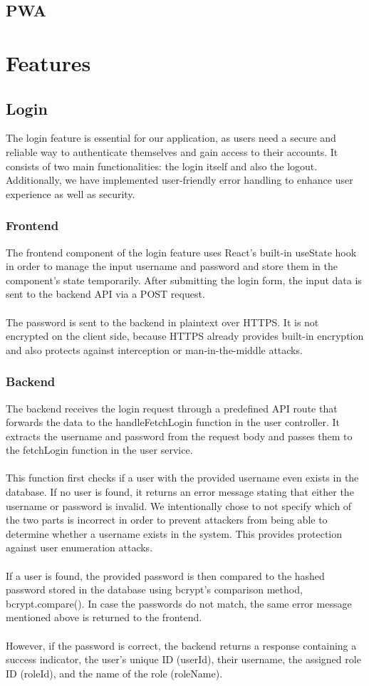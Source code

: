 \documentclass[a4paper,12pt]{report}
\begin{document}
\section{PWA}
\chapter{Features}

\section{Login}
The login feature is essential for our application, as users need a secure and reliable way to authenticate themselves and gain access to their accounts. It consists of two main functionalities: the login itself and also the logout. Additionally, we have implemented user-friendly error handling to enhance user experience as well as security.
\subsection{Frontend}
The frontend component of the login feature uses React's built-in useState hook in order to manage the input username and password and store them in the component's state temporarily. After submitting the login form, the input data is sent to the backend API via a POST request.\\\\
The password is sent to the backend in plaintext over HTTPS. It is not encrypted on the client side, because HTTPS already provides built-in encryption and also protects against interception or man-in-the-middle attacks.
\subsection{Backend}
The backend receives the login request through a predefined API route that forwards the data to the handleFetchLogin function in the user controller. It extracts the username and password from the request body and passes them to the fetchLogin function in the user service.\\\\
This function first checks if a user with the provided username even exists in the database. If no user is found, it returns an error message stating that either the username or password is invalid. We intentionally chose to not specify which of the two parts is incorrect in order to prevent attackers from being able to determine whether a username exists in the system. This provides protection against user enumeration attacks.\\\\
If a user is found, the provided password is then compared to the hashed password stored in the database using bcrypt's comparison method, bcrypt.compare(). In case the passwords do not match, the same error message mentioned above is returned to the frontend.\\\\
However, if the password is correct, the backend returns a response containing a success indicator, the user's unique ID (userId), their username, the assigned role ID (roleId), and the name of the role (roleName).
\end{document}
